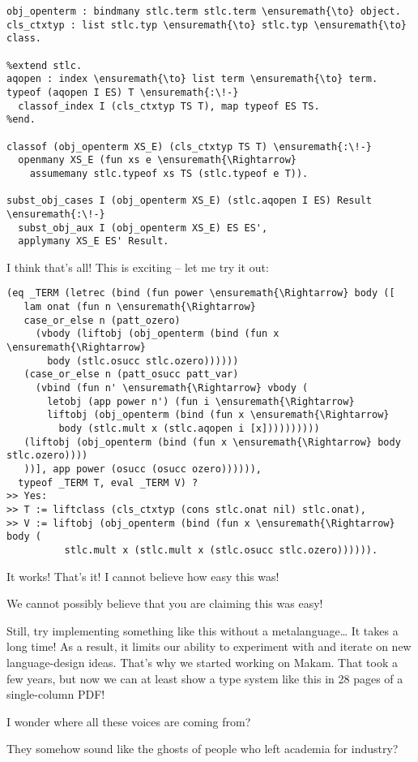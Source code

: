 \begin{verbatim}
obj_openterm : bindmany stlc.term stlc.term \ensuremath{\to} object.
cls_ctxtyp : list stlc.typ \ensuremath{\to} stlc.typ \ensuremath{\to} class.

%extend stlc.
aqopen : index \ensuremath{\to} list term \ensuremath{\to} term.
typeof (aqopen I ES) T \ensuremath{:\!-}
  classof_index I (cls_ctxtyp TS T), map typeof ES TS.
%end.

classof (obj_openterm XS_E) (cls_ctxtyp TS T) \ensuremath{:\!-}
  openmany XS_E (fun xs e \ensuremath{\Rightarrow} 
    assumemany stlc.typeof xs TS (stlc.typeof e T)).

subst_obj_cases I (obj_openterm XS_E) (stlc.aqopen I ES) Result \ensuremath{:\!-}
  subst_obj_aux I (obj_openterm XS_E) ES ES',
  applymany XS_E ES' Result.
\end{verbatim}

\heroSTUDENT{} I think that's all! This is exciting -- let me try it out:

\begin{verbatim}
(eq _TERM (letrec (bind (fun power \ensuremath{\Rightarrow} body ([
   lam onat (fun n \ensuremath{\Rightarrow}
   case_or_else n (patt_ozero)
     (vbody (liftobj (obj_openterm (bind (fun x \ensuremath{\Rightarrow}
       body (stlc.osucc stlc.ozero))))))
   (case_or_else n (patt_osucc patt_var)
     (vbind (fun n' \ensuremath{\Rightarrow} vbody (
       letobj (app power n') (fun i \ensuremath{\Rightarrow}
       liftobj (obj_openterm (bind (fun x \ensuremath{\Rightarrow}
         body (stlc.mult x (stlc.aqopen i [x])))))))))
   (liftobj (obj_openterm (bind (fun x \ensuremath{\Rightarrow} body stlc.ozero))))
   ))], app power (osucc (osucc ozero)))))),
  typeof _TERM T, eval _TERM V) ?
>> Yes:
>> T := liftclass (cls_ctxtyp (cons stlc.onat nil) stlc.onat),
>> V := liftobj (obj_openterm (bind (fun x \ensuremath{\Rightarrow} body (
          stlc.mult x (stlc.mult x (stlc.osucc stlc.ozero)))))).
\end{verbatim}

\noindent
It works! That's it! I cannot believe how easy this was!

\heroAUDIENCE{} We cannot possibly believe that you are claiming this was
easy!

\heroAUTHOR{} Still, try implementing something like this without a
metalanguage\ldots{} It takes a long time! As a result, it limits our
ability to experiment with and iterate on new language-design ideas.
That's why we started working on Makam. That took a few years, but now
we can at least show a type system like this in 28 pages of a
single-column PDF!

\heroADVISOR{} I wonder where all these voices are coming from?

\heroSTUDENT{} They somehow sound like the ghosts of people who left academia
for industry?
